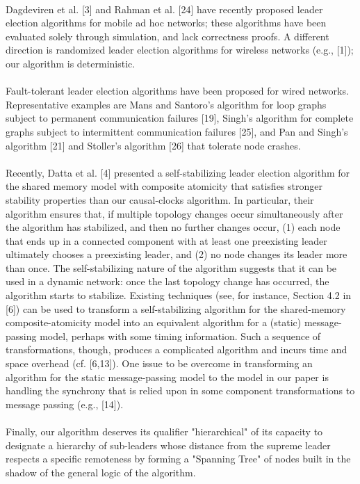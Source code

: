 \paragraph{}Dagdeviren et al. [3] and Rahman et al. [24] have recently proposed leader election algorithms for mobile ad hoc networks; these algorithms have been evaluated solely through simulation, and lack correctness proofs. A different direction is randomized leader election algorithms for wireless networks (e.g., [1]); our algorithm is deterministic.
\paragraph{}Fault-tolerant leader election algorithms have been proposed for wired networks. Representative examples are Mans and Santoro’s algorithm for loop graphs subject to permanent communication failures [19], Singh’s algorithm for complete graphs subject to intermittent communication failures [25], and Pan and Singh’s algorithm [21] and Stoller’s algorithm [26] that tolerate node crashes.
\paragraph{}Recently, Datta et al. [4] presented a self-stabilizing leader election algorithm for the shared memory model with composite atomicity that satisfies stronger stability properties than our causal-clocks algorithm. In particular, their algorithm ensures that, if multiple topology changes occur simultaneously after the algorithm has stabilized, and then no further changes occur, (1) each node that ends up in a connected component with at least one preexisting leader ultimately chooses a preexisting leader, and (2) no node changes its leader more than once. The self-stabilizing nature of the algorithm suggests that it can be used in a dynamic network: once the last topology change has occurred, the algorithm starts to stabilize. Existing techniques (see, for instance, Section 4.2 in [6]) can be used to transform a self-stabilizing algorithm for the shared-memory composite-atomicity model into an equivalent algorithm for a (static) message-passing model, perhaps with some timing information. Such a sequence of transformations, though, produces a complicated algorithm and incurs time and space overhead (cf. [6,13]). One issue to be overcome in transforming an algorithm for the static message-passing model to the model in our paper is handling the synchrony that is relied upon in some component transformations to message passing (e.g., [14]).
\paragraph{}Finally, our algorithm deserves its qualifier "hierarchical" of its capacity to designate a hierarchy of sub-leaders whose distance from the supreme leader respects a specific remoteness by forming a "Spanning Tree" of nodes built in the shadow of the general logic of the algorithm.
\paragraph{}